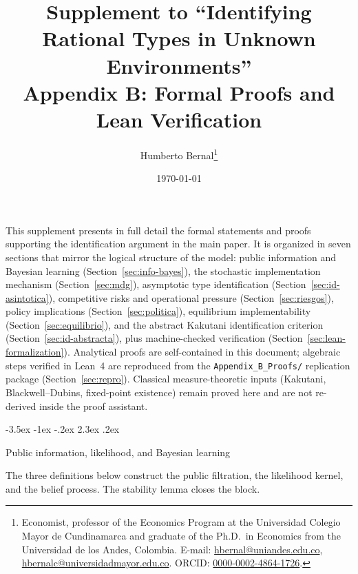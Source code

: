 \documentclass[12pt]{article}
\makeatletter
\numberwithin{equation}{section}
\numberwithin{table}{section}
\theoremstyle{definition}
\renewcommand\section{\@startsection {section}{1}{\z@}%
                                   {-3.5ex \@plus -1ex \@minus -.2ex}%
                                   {2.3ex \@plus.2ex}%
                                   {\normalfont\Large\bfseries\raggedright}}
\makeatother
\begin{document}
\title{Supplement to ``Identifying Rational Types in Unknown Environments''\\
Appendix B: Formal Proofs and Lean Verification}
\author{Humberto Bernal\thanks{Economist, professor of the Economics Program at the Universidad Colegio Mayor de Cundinamarca and graduate of the Ph.D.\ in Economics from the Universidad de los Andes, Colombia. E-mail: \href{mailto:hbernal@uniandes.edu.co}{hbernal@uniandes.edu.co}, \href{mailto:hbernalc@universidadmayor.edu.co}{hbernalc@universidadmayor.edu.co}. ORCID: \href{https://orcid.org/0000-0002-4864-1726}{0000-0002-4864-1726}.}}
\date{\today}
\maketitle

\noindent
This supplement presents in full detail the formal statements and proofs
supporting the identification argument in the main paper. It is organized in
seven sections that mirror the logical structure of the model: public information and Bayesian learning
(Section~\ref{sec:info-bayes}), the stochastic implementation mechanism
(Section~\ref{sec:mdg}), asymptotic type identification
(Section~\ref{sec:id-asintotica}), competitive risks and operational pressure
(Section~\ref{sec:riesgos}), policy implications (Section~\ref{sec:politica}),
equilibrium implementability (Section~\ref{sec:equilibrio}), and the abstract
Kakutani identification criterion (Section~\ref{sec:id-abstracta}), plus
machine-checked verification (Section~\ref{sec:lean-formalization}). Analytical
proofs are self-contained in this document; algebraic steps verified in Lean~4
are reproduced from the \texttt{Appendix\_B\_Proofs/} replication package
(Section~\ref{sec:repro}). Classical measure-theoretic inputs (Kakutani,
Blackwell--Dubins, fixed-point existence) remain proved here and are not
re-derived inside the proof assistant.

\section{Public information, likelihood, and Bayesian learning}
\label{sec:info-bayes}

\noindent The three definitions below construct the public filtration, the
likelihood kernel, and the belief process. The stability lemma closes the
block.
\end{document}
